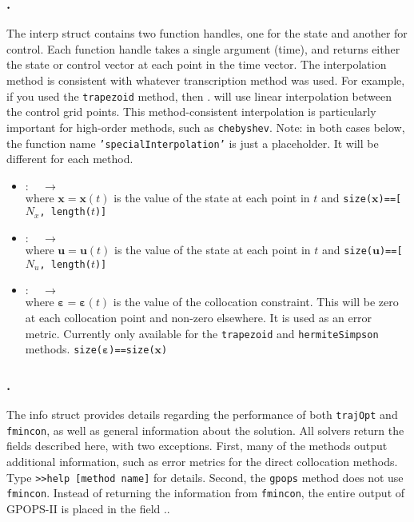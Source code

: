 \subsubsection*{.}
The interp struct contains two function handles, one for the state and another for control. Each function handle takes a single argument (time), and returns either the state or control vector at each point in the time vector. The interpolation method is consistent with whatever transcription method was used. For example, if you used the \texttt{trapezoid} method, then . will use linear interpolation between the control grid points. This method-consistent interpolation is particularly important for high-order methods, such as \texttt{chebyshev}. Note: in both cases below, the function name \texttt{'specialInterpolation'} is just a placeholder. It will be different for each method.
\begin{itemize}
\item {}
	${\bm: \quad \to \quad }$
	\\ where $\bm{x} = \bm{x}(t)$ is the value of the state at each point in $t$ and \texttt{size($\bm{x}$)==[$N_x$, length($t$)]}
\item {}
	${\bm: \quad \to \quad }$
	\\ where $\bm{u} = \bm{u}(t)$ is the value of the state at each point in $t$ and \texttt{size($\bm{u}$)==[$N_u$, length($t$)]}
\item {}
	${\bm: \quad \to \quad }$
	\tc{$\bm{\varepsilon}$ = }
	\\ where $\bm{\varepsilon} = \bm{\varepsilon}(t)$ is the value of the collocation constraint. This will be zero at each collocation point and non-zero elsewhere. It is used as an error metric. Currently only available for the \texttt{trapezoid} and \texttt{hermiteSimpson} methods.  \texttt{size($\bm{\varepsilon}$)==size($\bm{x}$)}
\end{itemize}



\subsubsection*{.}

The info struct provides details regarding the performance of both \texttt{trajOpt} and \texttt{fmincon}, as well as general information about the solution. All solvers return the fields described here, with two exceptions. First, many of the methods output additional information, such as error metrics for the direct collocation methods. Type \texttt{>>help [method name]} for details. Second, the \texttt{gpops} method does not use \texttt{fmincon}. Instead of returning the information from \texttt{fmincon}, the entire output of GPOPS-II is placed in the field ..

